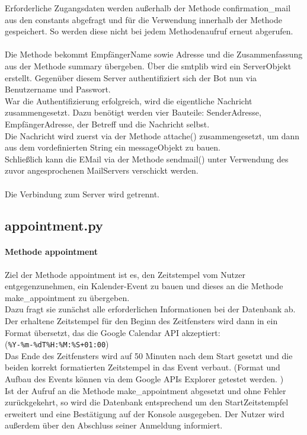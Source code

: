                Erforderliche Zugangsdaten werden außerhalb der Methode confirmation\_mail aus den constants abgefragt und für die Verwendung innerhalb der Methode gespeichert. So werden diese nicht bei jedem Methodenaufruf erneut abgerufen.\\
                \\
                Die Methode bekommt Empfänger\-Name sowie \-Adresse und die Zusammenfassung aus der Methode summary übergeben. Über die smtplib wird ein Server\-Objekt erstellt. Gegenüber diesem Server authentifiziert sich der Bot nun via Benutzername und Passwort.\\
                War die Authentifizierung erfolgreich, wird die eigentliche Nachricht zusammengesetzt. Dazu benötigt werden vier Bauteile: Sender\-Adresse, Empfänger\-Adresse, der Betreff und die Nachricht selbst.\\
                Die Nachricht wird zuerst via der Methode attache() zusammengesetzt, um dann aus dem vordefinierten String ein message\-Objekt zu bauen.\\
                Schließlich kann die E\-Mail via der Methode sendmail() unter Verwendung des zuvor angesprochenen Mail\-Servers verschickt werden.\\
                \\
                Die Verbindung zum Server wird getrennt.


        \subsection{appointment.py}
            \paragraph{Methode appointment}
                Ziel der Methode appointment ist es, den Zeitstempel vom Nutzer entgegenzunehmen, ein Kalender-Event zu bauen und dieses an die Methode make\_appointment zu übergeben. \\
                Dazu fragt sie zunächst alle erforderlichen Informationen bei der Datenbank ab. Der erhaltene Zeitstempel für den Beginn des Zeitfensters wird dann in ein Format übersetzt, das die Google Calendar API akzeptiert: \\ (\verb/%Y-%m-%dT%H:%M:%S+01:00/) \\
                Das Ende des Zeitfensters wird auf 50 Minuten nach dem Start gesetzt und die beiden korrekt formatierten Zeitstempel in das Event verbaut. (Format und Aufbau des Events können via dem Google APIs Explorer getestet werden. \cite{apiExplorer}) \\
                Ist der Aufruf an die Methode make\_appointment abgesetzt und ohne Fehler zurückgekehrt, so wird die Datenbank entsprechend um den Start\-Zeitstempfel erweitert und eine Bestätigung auf der Konsole ausgegeben. Der Nutzer wird außerdem über den Abschluss seiner Anmeldung informiert. 

